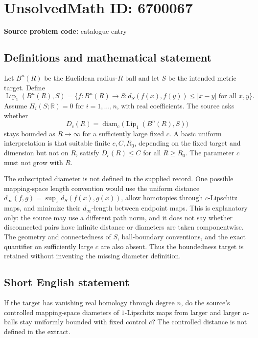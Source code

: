 \documentclass[11pt]{article}
\begin{document}
\section*{UnsolvedMath ID: 6700067}
\textbf{Source problem code:} catalogue entry
\subsection{Definitions and mathematical statement}
Let $B^n(R)$ be the Euclidean radius-$R$ ball and let $S$ be the intended metric target. Define
\[
\operatorname{Lip}_1(B^n(R),S)=\{f:B^n(R)\to S:d_S(f(x),f(y))\leq|x-y|\text{ for all }x,y\}.
\]
Assume $H_i(S;\mathbb R)=0$ for $i=1,\ldots,n$, with real coefficients. The source asks whether
\[
D_c(R)=\operatorname{diam}_c\bigl(\operatorname{Lip}_1(B^n(R),S)\bigr)
\]
stays bounded as $R\to\infty$ for a sufficiently large fixed $c$. A basic uniform interpretation is that suitable finite $c,C,R_0$, depending on the fixed target and dimension but not on $R$, satisfy $D_c(R)\leq C$ for all $R\geq R_0$. The parameter $c$ must not grow with $R$.

The subscripted diameter is not defined in the supplied record. One possible mapping-space length convention would use the uniform distance $d_\infty(f,g)=\sup_x d_S(f(x),g(x))$, allow homotopies through $c$-Lipschitz maps, and minimize their $d_\infty$-length between endpoint maps. This is explanatory only: the source may use a different path norm, and it does not say whether disconnected pairs have infinite distance or diameters are taken componentwise. The geometry and connectedness of $S$, ball-boundary conventions, and the exact quantifier on sufficiently large $c$ are also absent. Thus the boundedness target is retained without inventing the missing diameter definition.
\subsection{Short English statement}
If the target has vanishing real homology through degree $n$, do the source's controlled mapping-space diameters of $1$-Lipschitz maps from larger and larger $n$-balls stay uniformly bounded with fixed control $c$? The controlled distance is not defined in the extract.
\end{document}
